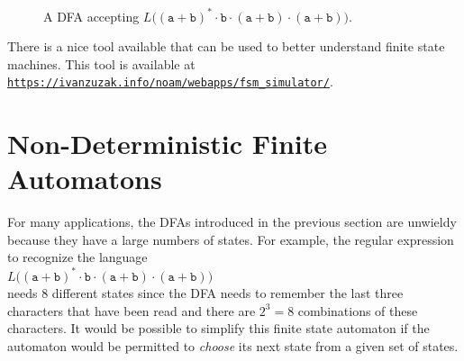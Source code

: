  \begin{figure}[!ht]
   \centering
    \caption{A \textsc{DFA} accepting
             $L\bigl((\texttt{a}+\texttt{b})^* \cdot \texttt{b} \cdot (\texttt{a}+\texttt{b}) \cdot (\texttt{a}+\texttt{b})\bigr)$.}
   \label{fig:abstarbabab.dot}
 \end{figure}

\remarkEng
There is a nice tool available that can be used to better understand finite state machines.  This
tool is available at
\\[0.2cm]
\hspace*{1.3cm}
\href{https://ivanzuzak.info/noam/webapps/fsm_simulator/}{\texttt{https://ivanzuzak.info/noam/webapps/fsm\_simulator/}}.


\section{Non-Deterministic Finite Automatons}
For many applications, the \textsc{DFA}s introduced in the previous section are unwieldy
because they have a large numbers of states.  For example, the regular expression to recognize the language
\\[0.2cm]
\hspace*{1.3cm}
$L\bigl((\texttt{a}+\texttt{b})^* \cdot \texttt{b} \cdot (\texttt{a}+\texttt{b}) \cdot (\texttt{a}+\texttt{b})\bigr)$ 
\\[0.2cm]
needs 8 different states since the \textsc{DFA} needs to remember the last three characters that
have been read and there are $2^3 = 8$ combinations of these characters.  
It would be possible to simplify this finite state automaton if the automaton would be permitted to \emph{choose} its
next state from a given set of states.

